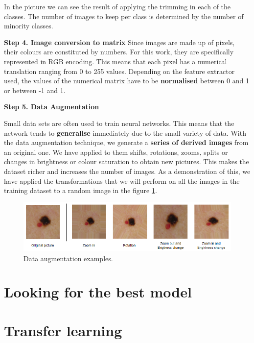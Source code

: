 In the picture we can see the result of applying the trimming in each of the classes. The number of images to keep per class is determined by the number of minority classes.


\textbf{Step 4. Image conversion to matrix}
Since images are made up of pixels, their colours are constituted by numbers. For this work,  they are specifically represented in RGB encoding. This means that each pixel has a numerical translation ranging from 0 to 255 values. Depending on the feature extractor used, the values of the numerical matrix have to be \textbf{normalised } between 0 and 1 or between -1 and 1. 

\textbf{Step 5. Data Augmentation}

Small data sets are often used to train neural networks. This means that the network tends to \textbf{generalise} immediately due to the small variety of data. With the data augmentation technique, we generate a \textbf{series of derived images} from an original one. We have applied to them shifts, rotations, zooms, splits or changes in brightness or colour saturation to obtain new pictures. This makes the dataset richer and increases the number of images. As a demonstration of this, we have applied the transformations that we will perform on all the images in the training dataset to a random image in the figure \ref{fig: Data augmentation examples}.

\begin{figure}[ht]
    \begin{center}
        \includegraphics[scale=0.5]{images/Building/Data augmentation.png}
        \caption{Data augmentation examples.}
    \label{fig: Data augmentation examples}    
    \end{center}
\end{figure}

 

\newpage
\section{Looking for the best model}

\newpage
\section{Transfer learning}

